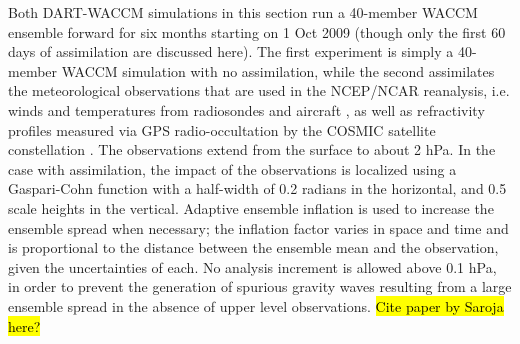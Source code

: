 Both DART-WACCM simulations in this section 
run a 40-member WACCM ensemble forward for six months starting on 1 Oct 2009 (though only the first 60 days of assimilation are discussed here).
The first experiment is simply a 40-member WACCM simulation with no assimilation, while the second 
assimilates the meteorological observations that are used in the NCEP/NCAR reanalysis, i.e. winds and temperatures from radiosondes and aircraft \citep{Saha2010}, as well as refractivity profiles measured via GPS radio-occultation by the COSMIC satellite constellation \citep{Anthes2008}.
The observations extend from the surface to about 2 hPa. 
In the case with assimilation, the impact of the observations is localized using a  
Gaspari-Cohn function \citep{Gaspari1999} with a half-width of 0.2 radians in the horizontal, and 0.5 scale heights in the vertical.  
Adaptive ensemble inflation \citep{Anderson2009tellus} is used to increase the ensemble spread when necessary; the inflation factor varies in space and time and is proportional to the distance between the ensemble mean and the observation, given the uncertainties of each.  
No analysis increment is allowed above 0.1 hPa, in order to prevent the generation of spurious gravity waves resulting from a large ensemble spread in the absence of upper level observations. 
\hl{Cite paper by Saroja here?}



